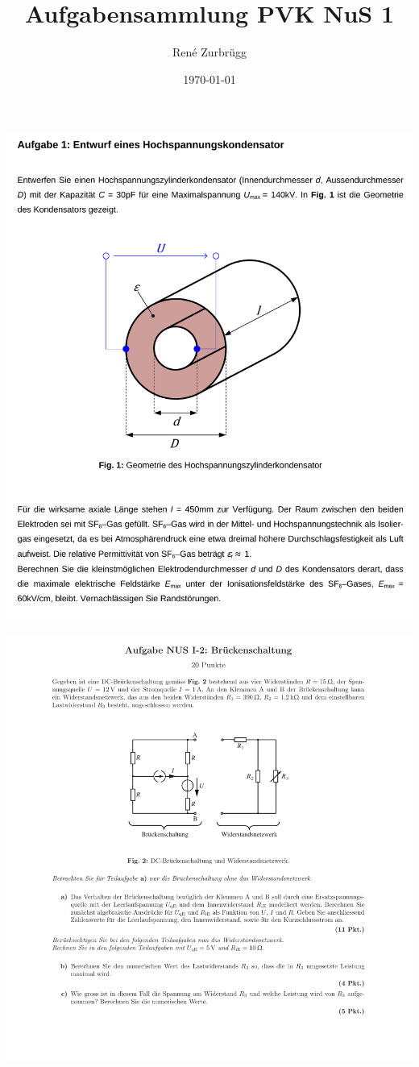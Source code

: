\documentclass[a4paper, 8pt, landscape]{scrartcl} %
\title{Aufgabensammlung PVK NuS 1}	%
\author{René Zurbrügg}	%
\date{\today}		%
\begin{document}
\begin{multicols}{2}
  \maketitle
  \begin{center}
      \includegraphics[width=0.8\columnwidth]{img/a1.pdf} \\
  \end{center}
    \vfill \null \columnbreak

  \includegraphics[width=\columnwidth]{img/a3.pdf} \\


\end{multicols}
\end{document}
